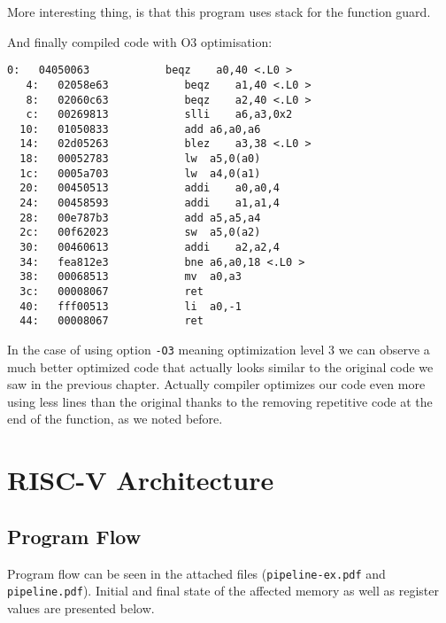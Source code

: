 \documentclass[a4paper]{article}
\begin{document}
More interesting thing, is that this program uses stack for the function guard.

And finally compiled code with O3 optimisation:

\begin{lstlisting}[language={[x86masm]Assembler}, caption=Refined Objdump output with -O3 option]
   0:	04050063          	beqz	a0,40 <.L0 >
   4:	02058e63          	beqz	a1,40 <.L0 >
   8:	02060c63          	beqz	a2,40 <.L0 >
   c:	00269813          	slli	a6,a3,0x2
  10:	01050833          	add	a6,a0,a6
  14:	02d05263          	blez	a3,38 <.L0 >
  18:	00052783          	lw	a5,0(a0)
  1c:	0005a703          	lw	a4,0(a1)
  20:	00450513          	addi	a0,a0,4
  24:	00458593          	addi	a1,a1,4
  28:	00e787b3          	add	a5,a5,a4
  2c:	00f62023          	sw	a5,0(a2)
  30:	00460613          	addi	a2,a2,4
  34:	fea812e3          	bne	a6,a0,18 <.L0 >
  38:	00068513          	mv	a0,a3
  3c:	00008067          	ret
  40:	fff00513          	li	a0,-1
  44:	00008067          	ret
\end{lstlisting}

In the case of using option \texttt{-O3} meaning optimization level 3 we can observe a much better optimized code that actually looks similar to the original code we saw in the previous chapter. Actually compiler optimizes our code even more using less lines than the original thanks to the removing repetitive code at the end of the function, as we noted before.

\section{RISC-V Architecture}
\subsection{Program Flow}

Program flow can be seen in the attached files (\texttt{pipeline-ex.pdf}  and \texttt{pipeline.pdf}). Initial and final state of the affected memory as well as register values are presented below.
\end{document}
